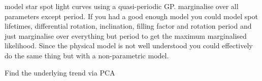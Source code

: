 \documentclass[12pt,preprint]{aastex}
\begin{document}
model star spot light curves using a quasi-periodic GP. 
marginalise over all parameters except period. 
If you had a good enough model you could model spot lifetimes, differential rotation, inclination, filling factor and rotation period and just marginalise over everything but period to get the maximum marginalised likelihood. 
Since the physical model is not well understood you could effectively do the same thing but with a non-parametric model. 

Find the underlying trend via PCA








\end{document}
